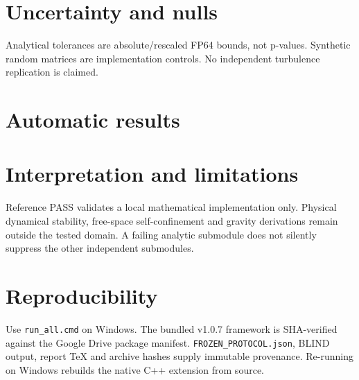 \documentclass[10pt,a4paper]{article}
\begin{document}
\section{Uncertainty and nulls}
Analytical tolerances are absolute/rescaled FP64 bounds, not p-values. Synthetic random matrices are implementation controls. No independent turbulence replication is claimed.
\section{Automatic results}
\section{Interpretation and limitations}
Reference PASS validates a local mathematical implementation only. Physical dynamical stability, free-space self-confinement and gravity derivations remain outside the tested domain. A failing analytic submodule does not silently suppress the other independent submodules.
\section{Reproducibility}
Use \texttt{run\_all.cmd} on Windows. The bundled v1.0.7 framework is SHA-verified against the Google Drive package manifest. \texttt{FROZEN\_PROTOCOL.json}, BLIND output, report TeX and archive hashes supply immutable provenance. Re-running on Windows rebuilds the native C++ extension from source.
\end{document}

